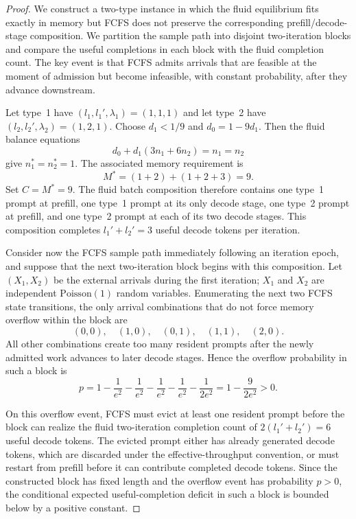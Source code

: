 \begin{proof}
We construct a two-type instance in which the fluid equilibrium fits exactly in memory but FCFS does not preserve the corresponding prefill/decode-stage composition. We partition the sample path into disjoint two-iteration blocks and compare the useful completions in each block with the fluid completion count. The key event is that FCFS admits arrivals that are feasible at the moment of admission but become infeasible, with constant probability, after they advance downstream.

Let type~1 have \((l_1,l_1',\lambda_1)=(1,1,1)\) and let type~2 have \((l_2,l_2',\lambda_2)=(1,2,1)\). Choose \(d_1<1/9\) and \(d_0=1-9d_1\). Then the fluid balance equations
\[
    d_0+d_1(3n_1+6n_2)=n_1=n_2
\]
give \(n_1^*=n_2^*=1\). The associated memory requirement is
\[
    M^*
    = (1+2) +(1+2+3)
    =9 .
\]
Set \(C=M^*=9\). The fluid batch composition therefore contains one type~1 prompt at prefill, one type~1 prompt at its only decode stage, one type~2 prompt at prefill, and one type~2 prompt at each of its two decode stages. This composition completes \(l_1'+l_2'=3\) useful decode tokens per iteration.

Consider now the FCFS sample path immediately following an iteration epoch, and suppose that the next two-iteration block begins with this composition. Let \((X_1,X_2)\) be the external arrivals during the first iteration; \(X_1\) and \(X_2\) are independent \(\mathrm{Poisson}(1)\) random variables. Enumerating the next two FCFS state transitions, the only arrival combinations that do not force memory overflow within the block are
\[
    (0,0),\quad (1,0),\quad (0,1),\quad (1,1),\quad (2,0).
\]
All other combinations create too many resident prompts after the newly admitted work advances to later decode stages. Hence the overflow probability in such a block is
\[
    p
    =
    1-\frac{1}{e^2}-\frac{1}{e^2}-\frac{1}{e^2}
      -\frac{1}{e^2}-\frac{1}{2e^2}
    =
    1-\frac{9}{2e^2}
    >0 .
\]

On this overflow event, FCFS must evict at least one resident prompt before the block can realize the fluid two-iteration completion count of \(2(l_1'+l_2')=6\) useful decode tokens. The evicted prompt either has already generated decode tokens, which are discarded under the effective-throughput convention, or must restart from prefill before it can contribute completed decode tokens. Since the constructed block has fixed length and the overflow event has probability \(p>0\), the conditional expected useful-completion deficit in such a block is bounded below by a positive constant.


\end{proof}
